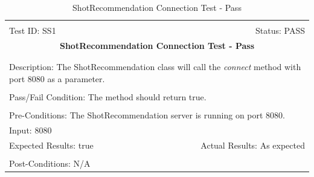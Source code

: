 \documentclass[11pt]{article}
\begin{document}
\begin{center}
\begin{table}[H]
\begin{tabular}{|l r|}\hline&\\[-2mm]
	Test ID: SS1	&Status: PASS\\[-3mm]
	\multicolumn{2}{|c|}{\textbf{\large{ShotRecommendation Connection Test - Pass}}}\\&\\\hline&\\[-3mm]
	\multicolumn{2}{|p{\textwidth}|}{Description: The ShotRecommendation class will call the \textit{connect} method with port 8080 as a parameter.}\\[1mm]\hline&\\[-3mm]
	\multicolumn{2}{|p{\textwidth}|}{Pass/Fail Condition: The method should return true.}\\[1mm]\hline&\\[-3mm]
	\multicolumn{2}{|p{\textwidth}|}{Pre-Conditions: The ShotRecommendation server is running on port 8080.}\\[4mm]
	\multicolumn{2}{|p{\textwidth}|}{Input: 8080}\\[2mm]\hline
	\multicolumn{1}{|p{0.49\textwidth}}{Expected Results: true}	&\multicolumn{1}{|p{0.45\textwidth}|}{Actual Results: As expected}\\\hline&\\[-3mm]
	\multicolumn{2}{|p{\textwidth}|}{Post-Conditions: N/A}\\\hline
\end{tabular}
\caption{ShotRecommendation Connection Test - Pass}
\end{table}
\end{center}
\end{document}
